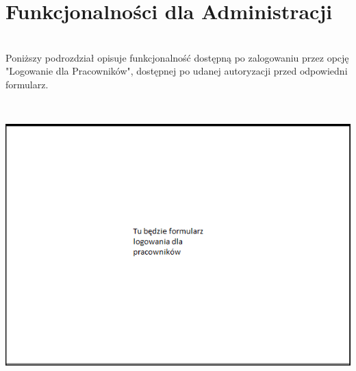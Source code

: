 \documentclass[licencjacka]{pracamgr}
\begin{document}
\section{Funkcjonalności dla Administracji}
~\\ \indent
Poniższy podrozdział opisuje funkcjonalność dostępną po zalogowaniu przez opcję "Logowanie dla Pracowników", dostępnej po udanej autoryzacji przed odpowiedni formularz. \par
 ~\\
\begin{minipage}{\linewidth}
	\centering
           \includegraphics[scale=0.7]{logowanieprac.png}
\end{minipage} \\ 
\end{document}
